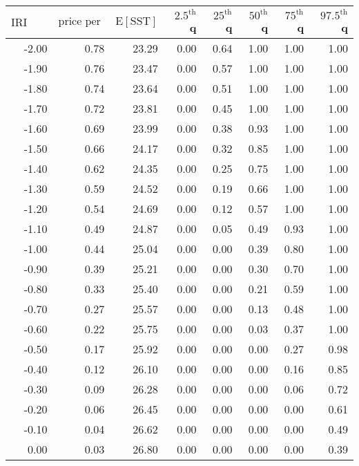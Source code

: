 \begin{table*}[ht]
\centering \footnotesize
\begin{tabular}{rrrrrrrr}
  \hline
$\mbox{IRI anom}$ & $\mbox{price per USD}$ & $\mbox{E}[\mbox{SST}]$ & $2.5^{\mbox{th}}$ q & $25^{\mbox{th}}$ q & $50^{\mbox{th}}$ q & $75^{\mbox{th}}$ q & $97.5^{\mbox{th}}$ q \\ 
  \hline
-2.00 & 0.78 & 23.29 & 0.00 & 0.64 & 1.00 & 1.00 & 1.00 \\ 
  -1.90 & 0.76 & 23.47 & 0.00 & 0.57 & 1.00 & 1.00 & 1.00 \\ 
  -1.80 & 0.74 & 23.64 & 0.00 & 0.51 & 1.00 & 1.00 & 1.00 \\ 
  -1.70 & 0.72 & 23.81 & 0.00 & 0.45 & 1.00 & 1.00 & 1.00 \\ 
  -1.60 & 0.69 & 23.99 & 0.00 & 0.38 & 0.93 & 1.00 & 1.00 \\ 
  -1.50 & 0.66 & 24.17 & 0.00 & 0.32 & 0.85 & 1.00 & 1.00 \\ 
  -1.40 & 0.62 & 24.35 & 0.00 & 0.25 & 0.75 & 1.00 & 1.00 \\ 
  -1.30 & 0.59 & 24.52 & 0.00 & 0.19 & 0.66 & 1.00 & 1.00 \\ 
  -1.20 & 0.54 & 24.69 & 0.00 & 0.12 & 0.57 & 1.00 & 1.00 \\ 
  -1.10 & 0.49 & 24.87 & 0.00 & 0.05 & 0.49 & 0.93 & 1.00 \\ 
  -1.00 & 0.44 & 25.04 & 0.00 & 0.00 & 0.39 & 0.80 & 1.00 \\ 
  -0.90 & 0.39 & 25.21 & 0.00 & 0.00 & 0.30 & 0.70 & 1.00 \\ 
  -0.80 & 0.33 & 25.40 & 0.00 & 0.00 & 0.21 & 0.59 & 1.00 \\ 
  -0.70 & 0.27 & 25.57 & 0.00 & 0.00 & 0.13 & 0.48 & 1.00 \\ 
  -0.60 & 0.22 & 25.75 & 0.00 & 0.00 & 0.03 & 0.37 & 1.00 \\ 
  -0.50 & 0.17 & 25.92 & 0.00 & 0.00 & 0.00 & 0.27 & 0.98 \\ 
  -0.40 & 0.12 & 26.10 & 0.00 & 0.00 & 0.00 & 0.16 & 0.85 \\ 
  -0.30 & 0.09 & 26.28 & 0.00 & 0.00 & 0.00 & 0.06 & 0.72 \\ 
  -0.20 & 0.06 & 26.45 & 0.00 & 0.00 & 0.00 & 0.00 & 0.61 \\ 
  -0.10 & 0.04 & 26.62 & 0.00 & 0.00 & 0.00 & 0.00 & 0.49 \\ 
  0.00 & 0.03 & 26.80 & 0.00 & 0.00 & 0.00 & 0.00 & 0.39 \\ 

\end{tabular}
\end{table*}
